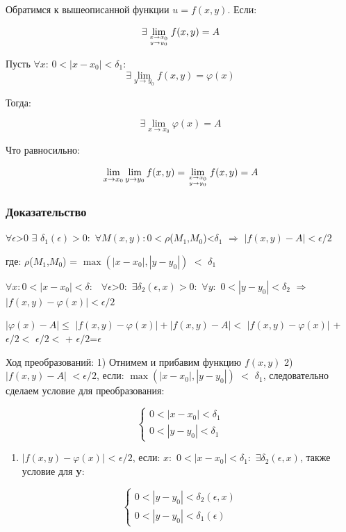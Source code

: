 Обратимся к вышеописанной функции \(u=f(x, y)\). Если:

\[\exists\lim _{x \rightarrow x_{0} \atop y \rightarrow y_{0} } f(x, y)=A\]

Пусть \(\forall\)\(x\): \(0<\left|x-x_{0}\right|<\delta_{1}\):
\[\exists\lim _{y \rightarrow y_{0}} f(x, y)=\varphi(x)\]

Тогда:

\[\exists\lim _{x \rightarrow x_{0}} \varphi(x)=A\]

Что равносильно:

\[\lim _{x \rightarrow x_{0}} \lim _{y \rightarrow y_{0}} f(x, y)=\lim _{x \rightarrow x_{0} \atop y \rightarrow y_{0}} f(x, y)=A\]

\subsubsection{Доказательство}

\(\forall \epsilon\)\textgreater{}0 \(\exists\)
\(\delta_{1}(\epsilon) > 0:\)
\(\forall M(x,y):\)\(0<\rho\)(\(M_{1}\),\(M_{0}\))\textless{}\(\delta_{1}\)
\(\Rightarrow\) \(\left|f(x,y)-A\right|<\epsilon/ 2\)

где: \(\rho\)(\(M_{1}\),\(M_{0}\)) = \(\max(|x-x_{0}|,| y-y_{0}|)\)
\(<\) \(\delta_{1}\)

\(\forall x:0<|x-x_{0}|<\delta:\)
\(\ \ \forall \epsilon\)\textgreater{}0\(:\)
\(\exists \delta_{2}(\epsilon,x)>0:\) \(\forall y:\)
\(0<\left|y-y_{0}\right|<\delta_{2}\) \(\Rightarrow\)
\(\left|f(x,y)-\varphi(x)\right|<\epsilon/ 2\)

\(\left|\varphi(x)-A\right|\leq\)
\(|f(x, y)-\varphi(x)|+| f(x, y)-A|\)\(<\) \(|f(x, y)-\varphi(x)|\) +
\(\epsilon/2<\) \(\epsilon/ 2<\) + \(\epsilon/ 2\)=\(\epsilon\)

Ход преобразований: 1) Отнимем и прибавим функцию \(f(x,y)\) 2)
\(| f(x, y)-A|\) \(< \epsilon /2\), если: \(\max(|x-x_{0}|,| y-y_{0}|)\)
\(<\) \(\delta_{1}\), следовательно сделаем условие для преобразования:

\[\left\{\begin{array}{l}
0<\left|x-x_{0}\right|<\delta_{1} \\
0<\left|y-y_{0}\right|<\delta_{1}
\end{array}\right.\]

\begin{enumerate}
\def\labelenumi{\arabic{enumi})}
\setcounter{enumi}{2}
\tightlist
\item
  \(|f(x, y)-\varphi(x)|\) \textless{} \(\epsilon /2\), если: \(x:\)
  \(0<\left|x-x_{0}\right|<\delta_{1}:\)
  \(\exists \delta_{2}(\epsilon, x)\), также условие для \textbf{y}:
\end{enumerate}

\[\left\{\begin{array}{l}
0<\left|y-y_{0}\right|<\delta_{2}(\epsilon, x) \\
0<\left|y-y_{0}\right|<\delta_{1}(\epsilon)
\end{array}\right.\]
